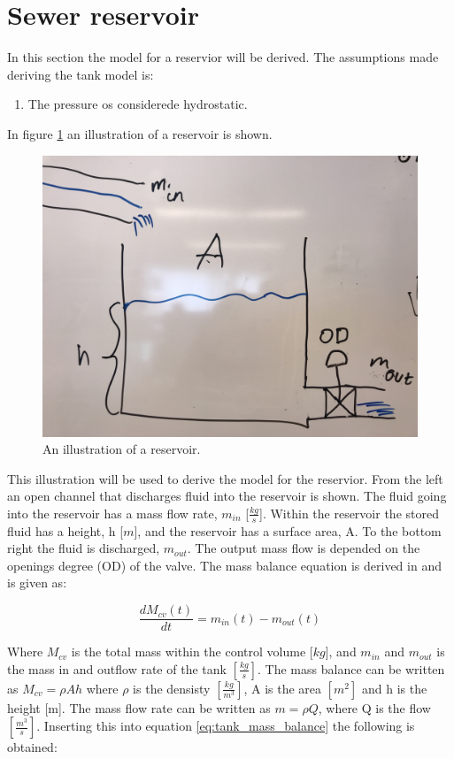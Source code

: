 \section{Sewer reservoir}\label{se:sewer_reservoir}
In this section the model for a reservior will be derived. 
The assumptions made deriving the tank model is:
\begin{table}[H]
\begin{enumerate}
\item The pressure os considerede hydrostatic.
\end{enumerate}
\end{table}

In figure \ref{fig:tank_model} an illustration of a reservoir is shown.
\begin{figure}[H]
\centering
\includegraphics[width=.6\textwidth]{report/modeling/pictures/tank_model.jpg}
\caption{An illustration of a reservoir.}
\label{fig:tank_model}
\end{figure} 

This illustration will be used to derive the model for the reservior. From the left an open channel that discharges fluid into the reservoir is shown. The fluid going into the reservoir has a mass flow rate, $m_{in}$ [$\frac{kg}{s}$]. Within the reservoir the stored fluid has a height, h [$m$], and the reservoir has a surface area, A. To the bottom right the fluid is discharged, $m_{out}$. The output mass flow is depended on the openings degree (OD) of the valve. The mass balance equation is derived in \cite{model_tank} and is given as:


\begin{equation}
	 	\frac{dM_{cv}(t)}{dt}=m_{in}(t)-m_{o ut}(t)
\label{eq:tank_mass_balance}
\end{equation} 

Where $M_{cv}$ is the total mass within the control volume [$kg$], and $m_{in}$ and $m_{out}$ is the mass in and outflow rate of the tank $\left[\frac{kg}{s}\right]$. The mass balance can be written as $M_{cv} = \rho Ah$ where $\rho$ is the densisty $\left[\frac{kg}{m^3}\right]$, A is the area $\left[m^2\right]$ and h is the height [m]. The mass flow rate can be written as $m = \rho Q$, where Q is the flow $\left[\frac{m^3}{s}\right]$. Inserting this into equation \ref{eq:tank_mass_balance} the following is obtained:

